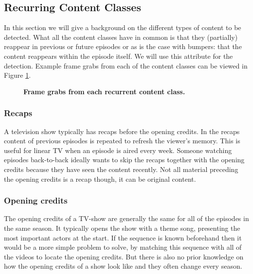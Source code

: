 \documentclass{article}
\begin{document}
\subsection{Recurring Content Classes} \label{section:segmentclasses}
In this section we will give a background on the different types of content to be detected. What all the content classes have in common is that they (partially) reappear in previous or future episodes or as is the case with bumpers: that the content reappears within the episode itself. We will use this attribute for the detection. Example frame grabs from each of the content classes can be viewed in Figure \ref{fig:introductionexamples}.

\begin{figure}[h]
	\caption{\textbf{Frame grabs from each recurrent content class.}}
	\label{fig:introductionexamples}
\end{figure}

\subsubsection{Recaps}
A television show typically has recaps before the opening credits. In the recaps content of previous episodes is repeated to refresh the viewer's memory. This is useful for linear TV when an episode is aired every week. Someone watching episodes back-to-back ideally wants to skip the recaps together with the opening credits because they have seen the content recently. Not all material preceding the opening credits is a recap though, it can be original content.

\subsubsection{Opening credits}
The opening credits of a TV-show are generally the same for all of the episodes in the same season. It typically opens the show with a theme song, presenting the most important actors at the start. If the sequence is known beforehand then it would be a more simple problem to solve, by matching this sequence with all of the videos to locate the opening credits. But there is also no prior knowledge on how the opening credits of a show look like and they often change every season.
\end{document}
